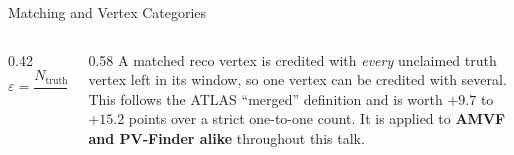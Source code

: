 \documentclass[xcolor=table,aspectratio=169]{beamer}
\newcommand{\ntrk}{\ensuremath{n_\mathrm{trk}}}
\begin{document}
\begin{frame}{Matching and Vertex Categories}
    \vspace{0.45em}
    \begin{columns}[c]
        \begin{column}{0.42\linewidth}
            \centering
            \footnotesize
            \[\varepsilon = \frac{N_\text{truth clean}+N_\text{truth merged}}{N_\text{truth}}
              \qquad (\ntrk\geq2)\]
        \end{column}
        \begin{column}{0.58\linewidth}
            {\footnotesize\textcolor{black!65}{A matched reco vertex is credited with
            \emph{every} unclaimed truth vertex left in its window, so one vertex can be
            credited with several. This follows the ATLAS ``merged'' definition and is
            worth $+9.7$ to $+15.2$ points over a strict one-to-one count. It is applied
            to \textbf{AMVF and PV-Finder alike} throughout this talk.}}
        \end{column}
    \end{columns}
\end{frame}
\end{document}
